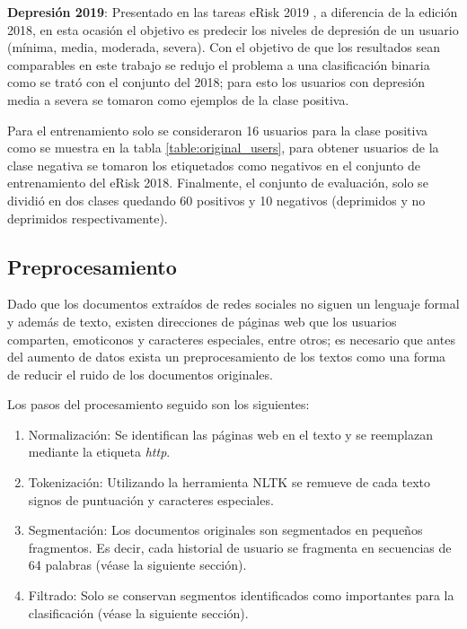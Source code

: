 \textbf{Depresión 2019}: Presentado en las tareas eRisk 2019 \cite{Losada2019}, a diferencia de la edición 2018, en esta ocasión el objetivo es predecir los niveles de depresión de un usuario (mínima, media, moderada, severa). Con el objetivo de que los resultados sean comparables en este trabajo se redujo el problema a una clasificación binaria como se trató con el conjunto del 2018; para esto los usuarios con depresión media a severa se tomaron como ejemplos de la clase positiva.

Para el entrenamiento solo se consideraron 16 usuarios para la clase positiva como se muestra en la tabla \ref{table:original_users}, para obtener usuarios de la clase negativa se tomaron los etiquetados como negativos en el conjunto de entrenamiento del eRisk 2018. Finalmente, el conjunto de evaluación, solo se dividió en dos clases quedando 60 positivos y 10 negativos (deprimidos y no deprimidos respectivamente).







\subsection{Preprocesamiento}

Dado que los documentos extraídos de redes sociales no siguen un lenguaje formal y además de texto, existen direcciones de páginas web que los usuarios comparten, emoticonos y caracteres especiales, entre otros; es necesario que antes del aumento de datos exista un preprocesamiento de los textos como una forma de reducir el ruido de los documentos originales.

Los pasos del procesamiento seguido son los siguientes:

 \begin{enumerate}
     \item Normalización: Se identifican las páginas web en el texto y se reemplazan mediante la etiqueta \textit{http}.
     \item Tokenización: Utilizando la herramienta NLTK se remueve de cada texto signos de puntuación y caracteres especiales.
     \item Segmentación: Los documentos originales son segmentados en pequeños fragmentos. Es decir, cada historial de usuario se fragmenta en secuencias de 64 palabras  (véase la siguiente sección).
     \item Filtrado: Solo se conservan segmentos identificados como importantes para la clasificación (véase la siguiente sección).
 \end{enumerate}



